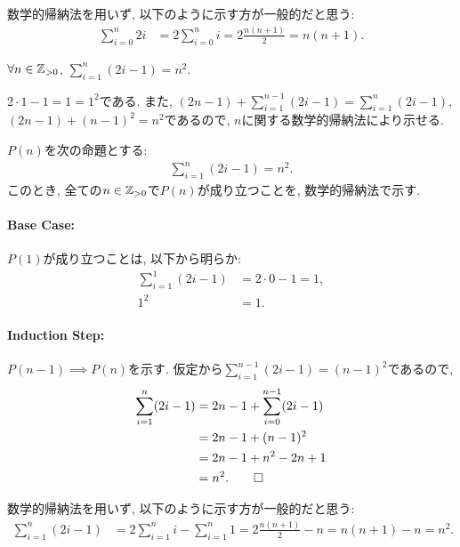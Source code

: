 \begin{rem}
  数学的帰納法を用いず, 以下のように示す方が一般的だと思う:
  \begin{align*}
    \sum_{i=0}^{n}2i&=
    2\sum_{i=0}^{n}i
    =2\frac{n(n+1)}{2}=n(n+1).
  \end{align*}
\end{rem}

\begin{prop}
  $\forall n\in\mathbb{Z}_{>0}$, $\sum_{i=1}^{n}(2i-1)=n^2$.
\end{prop}

\begin{proof**}
  $2\cdot 1-1=1=1^2$である.
  また,
  $(2n-1)+\sum_{i=1}^{n-1}(2i-1)=\sum_{i=1}^{n}(2i-1)$,
  $(2n-1)+(n-1)^2=n^2$であるので,
  $n$に関する数学的帰納法により示せる.
\end{proof**}

\begin{proof*}
  $P(n)$を次の命題とする:
  \begin{align*}
    \sum_{i=1}^{n}(2i-1)=n^2.
  \end{align*}
  このとき,
  全ての$n\in\mathbb{Z}_{>0}$で$P(n)$が成り立つことを,
  数学的帰納法で示す.

  \paragraph{Base Case:}
  $P(1)$が成り立つことは, 以下から明らか:
  \begin{align*}
    \sum_{i=1}^{1}(2i-1)&=2\cdot 0-1=1,\\
    1^2&=1.
  \end{align*}

  \paragraph{Induction Step:}
  $P(n-1)\implies P(n)$を示す.
  仮定から$\sum_{i=1}^{n-1}(2i-1)=(n-1)^2$であるので,
  \begin{align*}
    \sum_{i=1}^{n}(2i-1)&=2n-1+\sum_{i=0}^{n-1}(2i-1)\\
    &=2n-1+(n-1)^2\\
    &=2n-1+n^2-2n+1\\
    &=n^2.
    \qedhere
  \end{align*}
\end{proof*}

\begin{rem}
  数学的帰納法を用いず, 以下のように示す方が一般的だと思う:
  \begin{align*}
    \sum_{i=1}^{n}(2i-1)&=
    2\sum_{i=1}^{n}i-\sum_{i=1}^n 1
    =2\frac{n(n+1)}{2}-n=n(n+1)-n=n^2.
  \end{align*}
\end{rem}

